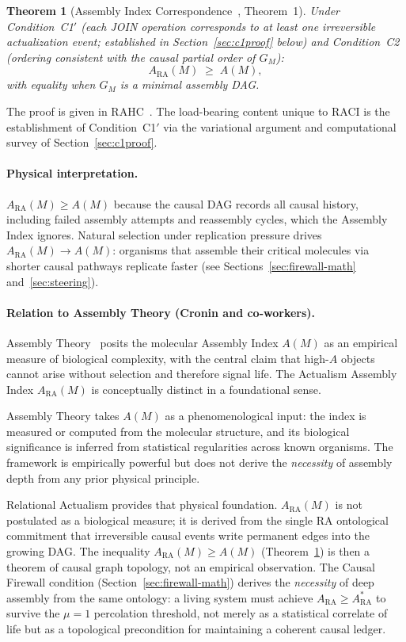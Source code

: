 \documentclass[11pt,a4paper]{article}
\theoremstyle{plain}
\newtheorem{theorem}{Theorem}[section]
\theoremstyle{definition}
\theoremstyle{remark}
\newcommand{\ARA}{A_{\mathrm{RA}}}
\newcommand{\GM}{G_{M}}
\begin{document}
\begin{theorem}[Assembly Index Correspondence~{\normalfont\citep{Sandeman2026RAHC},
Theorem~1}]
\label{thm:assembly}
Under Condition~C1$'$ (each JOIN operation corresponds to at least one irreversible
actualization event; established in Section~\ref{sec:c1proof} below) and
Condition~C2 (ordering consistent with the causal partial order of $\GM$):
\begin{equation}
  \ARA(M) \;\geq\; A(M),
\end{equation}
with equality when $\GM$ is a minimal assembly DAG.
\end{theorem}

The proof is given in RAHC~\citep{Sandeman2026RAHC}. The load-bearing content
unique to RACI is the establishment of Condition~C1$'$ via the variational
argument and computational survey of Section~\ref{sec:c1proof}.

\paragraph{Physical interpretation.}
$\ARA(M) \geq A(M)$ because the causal DAG records all causal history, including
failed assembly attempts and reassembly cycles, which the Assembly Index ignores.
Natural selection under replication pressure drives $\ARA(M) \to A(M)$: organisms
that assemble their critical molecules via shorter causal pathways replicate faster
(see Sections~\ref{sec:firewall-math} and~\ref{sec:steering}).

\paragraph{Relation to Assembly Theory (Cronin and co-workers).}
Assembly Theory~\citep{Marshall2021,Cronin2022} posits the molecular Assembly Index
$A(M)$ as an empirical measure of biological complexity, with the central claim that
high-$A$ objects cannot arise without selection and therefore signal life.  The
Actualism Assembly Index $\ARA(M)$ is conceptually distinct in a foundational sense.

Assembly Theory takes $A(M)$ as a phenomenological input: the index is measured or
computed from the molecular structure, and its biological significance is inferred
from statistical regularities across known organisms.  The framework is empirically
powerful but does not derive the \emph{necessity} of assembly depth from any
prior physical principle.

Relational Actualism provides that physical foundation.  $\ARA(M)$ is not
postulated as a biological measure; it is derived from the single RA ontological
commitment that irreversible causal events write permanent edges into the growing
DAG.  The inequality $\ARA(M) \geq A(M)$ (Theorem~\ref{thm:assembly}) is then a
theorem of causal graph topology, not an empirical observation.  The Causal
Firewall condition (Section~\ref{sec:firewall-math}) derives the \emph{necessity}
of deep assembly from the same ontology: a living system must achieve $\ARA \geq
\ARA^*$ to survive the $\mu=1$ percolation threshold, not merely as a statistical
correlate of life but as a topological precondition for maintaining a coherent
causal ledger.
\end{document}
